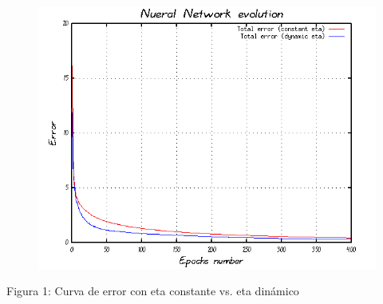 \documentclass[%
    final,
    reprint,
    notitlepage,
    narroweqnarray,
    inline,
    twoside,
    invited
    ]{ieee}
\begin{document}
\begin{figure}[H]
\begin{center}
\includegraphics[scale=0.85]{./images/g1.png}
\label{modelado}
\end{center}
\end{figure}

\begin{center}
\par Figura 1: Curva de error con eta constante vs. eta dinámico
\end{center}



\end{document}
